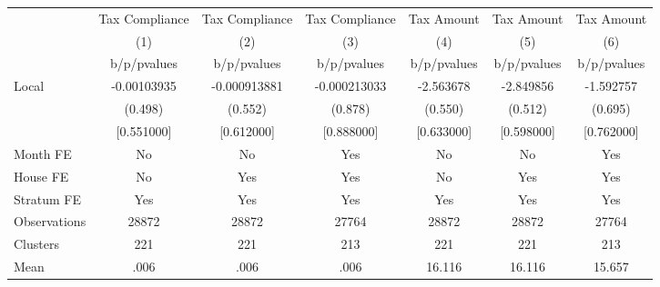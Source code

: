 {
\def\sym#1{\ifmmode^{#1}\else\(^{#1}\)\fi}
\begin{tabular}{l*{6}{c}}
\hline\hline
                &\multicolumn{1}{c}{Tax Compliance}&\multicolumn{1}{c}{Tax Compliance}&\multicolumn{1}{c}{Tax Compliance}&\multicolumn{1}{c}{Tax Amount}&\multicolumn{1}{c}{Tax Amount}&\multicolumn{1}{c}{Tax Amount}\\
                &\multicolumn{1}{c}{(1)}&\multicolumn{1}{c}{(2)}&\multicolumn{1}{c}{(3)}&\multicolumn{1}{c}{(4)}&\multicolumn{1}{c}{(5)}&\multicolumn{1}{c}{(6)}\\
                &b/p/pvalues&b/p/pvalues&b/p/pvalues&b/p/pvalues&b/p/pvalues&b/p/pvalues\\
\hline
Local           &-0.00103935&-0.000913881&-0.000213033&-2.563678&-2.849856&-1.592757\\
                &  (0.498)&  (0.552)&  (0.878)&  (0.550)&  (0.512)&  (0.695)\\
                &[0.551000]&[0.612000]&[0.888000]&[0.633000]&[0.598000]&[0.762000]\\
Month FE        &       No&       No&      Yes&       No&       No&      Yes\\
House FE        &       No&      Yes&      Yes&       No&      Yes&      Yes\\
Stratum FE      &      Yes&      Yes&      Yes&      Yes&      Yes&      Yes\\
\hline
Observations    &    28872&    28872&    27764&    28872&    28872&    27764\\
Clusters        &      221&      221&      213&      221&      221&      213\\
Mean            &     .006&     .006&     .006&   16.116&   16.116&   15.657\\
\hline\hline
\end{tabular}
}
